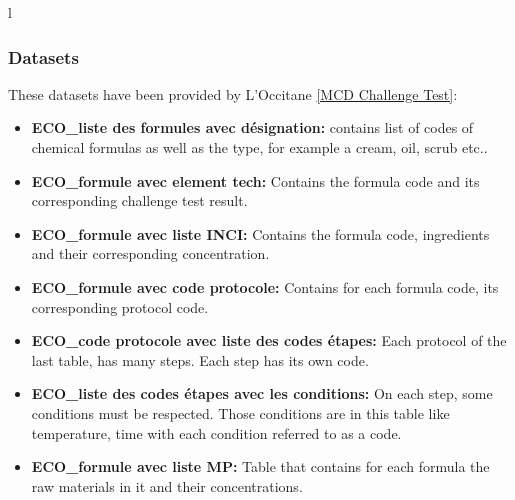 l\documentclass[a4paper,12pt,twoside]{report}
\begin{document}
\subsubsection{Datasets}
These datasets have been provided by L'Occitane \ref{MCD Challenge Test}:
\begin{itemize}
\item \textbf{ECO\_liste des formules avec désignation:} contains list of codes of chemical formulas as well as the type, for example a cream, oil, scrub etc..
\item \textbf{ECO\_formule avec element tech:} Contains the formula code and its corresponding challenge test result.
\item \textbf{ECO\_formule avec liste INCI:} Contains the formula code, ingredients and their corresponding concentration.
\item \textbf{ECO\_formule avec code protocole:} Contains for each formula code, its corresponding protocol code. 
\item \textbf{ECO\_code protocole avec liste des codes étapes:} Each protocol of the last table, has many steps. Each step has its own code.
\item \textbf{ECO\_liste des codes étapes avec les conditions:} On each step, some conditions must be respected. Those conditions are in this table like temperature, time with each condition referred to as a code.
\item \textbf{ECO\_formule avec liste MP:} Table that contains for each formula the raw materials in it and their concentrations.
\end{itemize}
\end{document}
